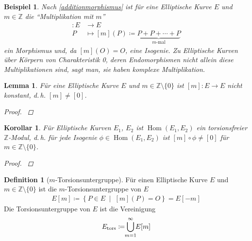 \documentclass[english, german, parskip=half]{scrartcl}
\newtheorem{Lemma}[Satz]{Lemma}
\newtheorem{Korollar}[Satz]{Korollar}
\newtheorem{Beispiel}[Satz]{Beispiel}
\theoremstyle{definition}
\newtheorem{Definition}[Satz]{Definition}
\theoremstyle{remark}
\newcommand*{\Z}{\mathds{Z}}
\newcommand*{\longto}{\longrightarrow}
\DeclareMathOperator{\Hom}{Hom}
\begin{document}
\begin{Beispiel}
  Nach \autoref{additionmorphismus} ist für eine Elliptische Kurve $E$
  und $m\in\Z$ die \enquote{Multiplikation mit $m$}
  \begin{align*}
    [m]\colon E &\longto E\\
    P&\longmapsto [m](P) \coloneqq
       \underbrace{P+P+\dotsb+P}_{m\text{-mal}}
  \end{align*}
  ein Morphismus und, da $[m](O)=O$, eine Isogenie.
  Zu Elliptische Kurven über Körpern von Charakteristik 0, deren
  Endomorphismen nicht allein diese Multiplikationen sind, sagt man,
  sie haben komplexe Multiplikation.
\end{Beispiel}

\begin{Lemma}
  Für eine Elliptische Kurve $E$ und $m\in\Z\setminus\{0\}$
  ist $[m]\colon E\to E$ nicht konstant, d.\,h. $[m]\neq[0]$.
  \begin{proof}
    \cite[siehe][Proposition 4.2 (a)]{silverman}
  \end{proof}
\end{Lemma}

\begin{Korollar}
  Für Elliptische Kurven $E_1$, $E_2$ ist $\Hom(E_1,E_2)$ ein
  torsionsfreier $\Z$-Modul, d.\,h. für jede Isogenie
  $\phi\in\Hom(E_1,E_2)$ ist $[m]\circ\phi\neq[0]$ für $m\in\Z\setminus\{0\}$.
    \begin{proof}
    \cite[siehe][Proposition 4.2 (b)]{silverman}
  \end{proof}
\end{Korollar}

\begin{Definition}[$m$-Torsionsuntergruppe]
  Für einen Elliptische Kurve $E$ und $m\in\Z\setminus\{0\}$ ist die
  $m$-Torsionsuntergruppe von $E$
  \begin{gather*}
    E[m] \coloneqq \left\{ P\in E\;\middle|\; [m](P)=O\right\}
    = E[-m]
  \end{gather*}
  Die Torsionsuntergruppe von $E$ ist die Vereinigung
  \begin{gather*}
    E_\text{tors} \coloneqq \bigcup_{\mathclap{m=1}}^{\infty}E[m]
  \end{gather*}
\end{Definition}



\end{document}
